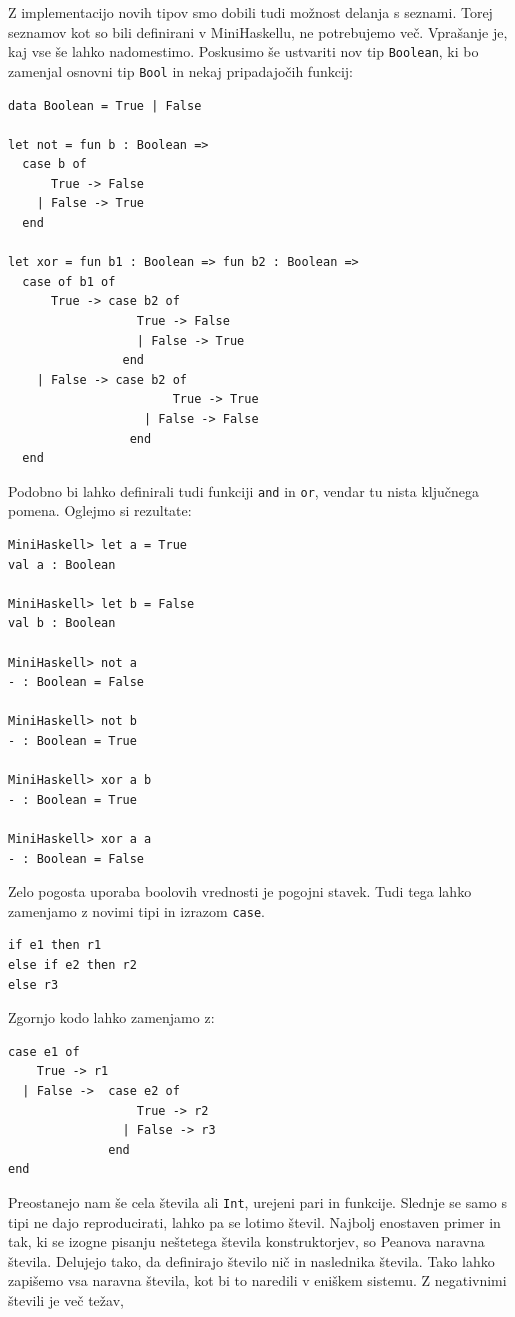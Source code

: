 \documentclass[a4paper,12pt,openright]{book}
\begin{document}
Z implementacijo novih tipov smo dobili tudi možnost delanja s seznami. Torej seznamov kot so bili definirani v MiniHaskellu, ne potrebujemo več. Vprašanje je, kaj vse še lahko nadomestimo.
Poskusimo še ustvariti nov tip \lstinline{Boolean}, ki bo zamenjal osnovni tip \lstinline{Bool} in nekaj pripadajočih funkcij:
\begin{lstlisting}
data Boolean = True | False
	
let not = fun b : Boolean => 
  case b of 
      True -> False 
    | False -> True 
  end

let xor = fun b1 : Boolean => fun b2 : Boolean =>
  case of b1 of
      True -> case b2 of
                  True -> False
	              | False -> True
	            end
    | False -> case b2 of
		               True -> True
	               | False -> False
	             end
  end
\end{lstlisting}
Podobno bi lahko definirali tudi funkciji \lstinline{and} in \lstinline{or}, vendar tu nista ključnega pomena. Oglejmo si rezultate:
\begin{lstlisting}
MiniHaskell> let a = True
val a : Boolean

MiniHaskell> let b = False
val b : Boolean

MiniHaskell> not a
- : Boolean = False

MiniHaskell> not b
- : Boolean = True

MiniHaskell> xor a b
- : Boolean = True

MiniHaskell> xor a a
- : Boolean = False
\end{lstlisting}
Zelo pogosta uporaba boolovih vrednosti je pogojni stavek. Tudi tega lahko zamenjamo z novimi tipi in izrazom \lstinline{case}.
\begin{lstlisting}
if e1 then r1
else if e2 then r2
else r3
\end{lstlisting}
Zgornjo kodo lahko zamenjamo z:
\begin{lstlisting}
case e1 of
    True -> r1
  | False ->  case e2 of
                  True -> r2
                | False -> r3
              end
end
\end{lstlisting}
Preostanejo nam še cela števila ali \lstinline{Int}, urejeni pari in funkcije. Slednje se samo s tipi ne dajo reproducirati, lahko pa se lotimo števil. Najbolj enostaven primer in tak, ki se izogne pisanju neštetega števila 
konstruktorjev, so Peanova naravna števila. Delujejo tako, da definirajo število nič in naslednika števila. Tako lahko zapišemo vsa naravna števila, kot bi to naredili v eniškem sistemu. Z negativnimi števili je več težav, 
\end{document}
